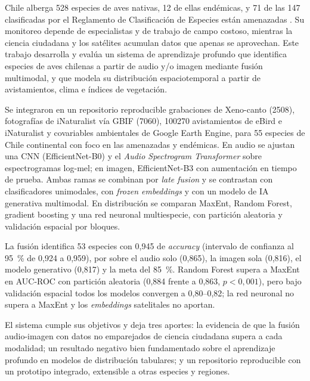 Chile alberga 528 especies de aves nativas, 12 de ellas endémicas, y 71 de
las 147 clasificadas por el Reglamento de Clasificación de Especies están
amenazadas \citep{mma2026rce}. Su monitoreo depende de especialistas y de
trabajo de campo costoso, mientras la ciencia ciudadana y los satélites
acumulan datos que apenas se aprovechan. Este trabajo desarrolla y evalúa un
sistema de aprendizaje profundo que identifica especies de aves chilenas a
partir de audio y/o imagen mediante fusión multimodal, y que modela su
distribución espaciotemporal a partir de avistamientos, clima e índices de
vegetación.

Se integraron en un repositorio reproducible grabaciones de Xeno-canto
(\num{2508}), fotografías de iNaturalist vía GBIF (\num{7060}),
\num{100270} avistamientos de eBird e iNaturalist y covariables ambientales
de Google Earth Engine, para 55 especies de Chile continental con foco en
las amenazadas y endémicas. En audio se ajustan una CNN (EfficientNet-B0) y
el \textit{Audio Spectrogram Transformer} sobre espectrogramas log-mel; en
imagen, EfficientNet-B3 con aumentación en tiempo de prueba. Ambas ramas se
combinan por \textit{late fusion} y se contrastan con clasificadores
unimodales, con \textit{frozen embeddings} y con un modelo de IA generativa
multimodal. En distribución se comparan MaxEnt, Random Forest, gradient
boosting y una red neuronal multiespecie, con partición aleatoria y
validación espacial por bloques.

La fusión identifica 53 especies con 0,945 de \textit{accuracy} (intervalo
de confianza al \SI{95}{\percent} de 0,924 a 0,959), por sobre el audio solo
(0,865), la imagen sola (0,816), el modelo generativo (0,817) y la meta del
\SI{85}{\percent}. Random Forest supera a MaxEnt en AUC-ROC con partición
aleatoria (0,884 frente a 0,863, $p < 0{,}001$), pero bajo validación
espacial todos los modelos convergen a 0,80--0,82; la red neuronal no supera
a MaxEnt y los \textit{embeddings} satelitales no aportan.

El sistema cumple sus objetivos y deja tres aportes: la evidencia de que la
fusión audio-imagen con datos no emparejados de ciencia ciudadana supera a
cada modalidad; un resultado negativo bien fundamentado sobre el aprendizaje
profundo en modelos de distribución tabulares; y un repositorio reproducible
con un prototipo integrado, extensible a otras especies y regiones.

